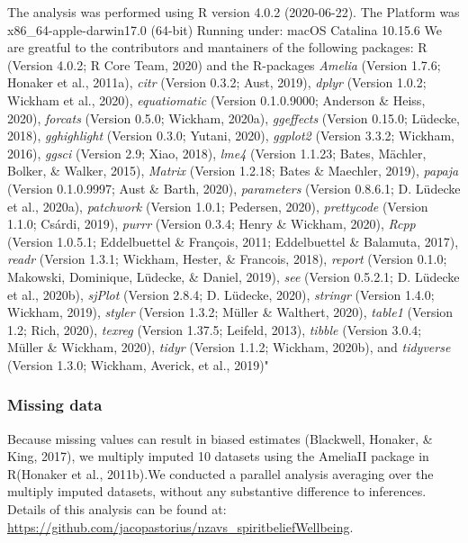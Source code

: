 \documentclass[
  english,
  man]{apa6}
\begin{document}
The analysis was performed using R version 4.0.2 (2020-06-22). The Platform was x86\_64-apple-darwin17.0 (64-bit) Running under: macOS Catalina 10.15.6
We are greatful to the contributors and mantainers of the following packages:
R (Version 4.0.2; R Core Team, 2020) and the R-packages \emph{Amelia} (Version 1.7.6; Honaker et al., 2011a), \emph{citr} (Version 0.3.2; Aust, 2019), \emph{dplyr} (Version 1.0.2; Wickham et al., 2020), \emph{equatiomatic} (Version 0.1.0.9000; Anderson \& Heiss, 2020), \emph{forcats} (Version 0.5.0; Wickham, 2020a), \emph{ggeffects} (Version 0.15.0; Lüdecke, 2018), \emph{gghighlight} (Version 0.3.0; Yutani, 2020), \emph{ggplot2} (Version 3.3.2; Wickham, 2016), \emph{ggsci} (Version 2.9; Xiao, 2018), \emph{lme4} (Version 1.1.23; Bates, Mächler, Bolker, \& Walker, 2015), \emph{Matrix} (Version 1.2.18; Bates \& Maechler, 2019), \emph{papaja} (Version 0.1.0.9997; Aust \& Barth, 2020), \emph{parameters} (Version 0.8.6.1; D. Lüdecke et al., 2020a), \emph{patchwork} (Version 1.0.1; Pedersen, 2020), \emph{prettycode} (Version 1.1.0; Csárdi, 2019), \emph{purrr} (Version 0.3.4; Henry \& Wickham, 2020), \emph{Rcpp} (Version 1.0.5.1; Eddelbuettel \& François, 2011; Eddelbuettel \& Balamuta, 2017), \emph{readr} (Version 1.3.1; Wickham, Hester, \& Francois, 2018), \emph{report} (Version 0.1.0; Makowski, Dominique, Lüdecke, \& Daniel, 2019), \emph{see} (Version 0.5.2.1; D. Lüdecke et al., 2020b), \emph{sjPlot} (Version 2.8.4; D. Lüdecke, 2020), \emph{stringr} (Version 1.4.0; Wickham, 2019), \emph{styler} (Version 1.3.2; Müller \& Walthert, 2020), \emph{table1} (Version 1.2; Rich, 2020), \emph{texreg} (Version 1.37.5; Leifeld, 2013), \emph{tibble} (Version 3.0.4; Müller \& Wickham, 2020), \emph{tidyr} (Version 1.1.2; Wickham, 2020b), and \emph{tidyverse} (Version 1.3.0; Wickham, Averick, et al., 2019)"

\hypertarget{missing-data}{%
\subsubsection{Missing data}\label{missing-data}}

Because missing values can result in biased estimates (Blackwell, Honaker, \& King, 2017), we multiply imputed 10 datasets using the AmeliaII package in R(Honaker et al., 2011b).We conducted a parallel analysis averaging over the multiply imputed datasets, without any substantive difference to inferences. Details of this analysis can be found at: \url{https://github.com/jacopastorius/nzavs_spiritbeliefWellbeing}.
\end{document}
